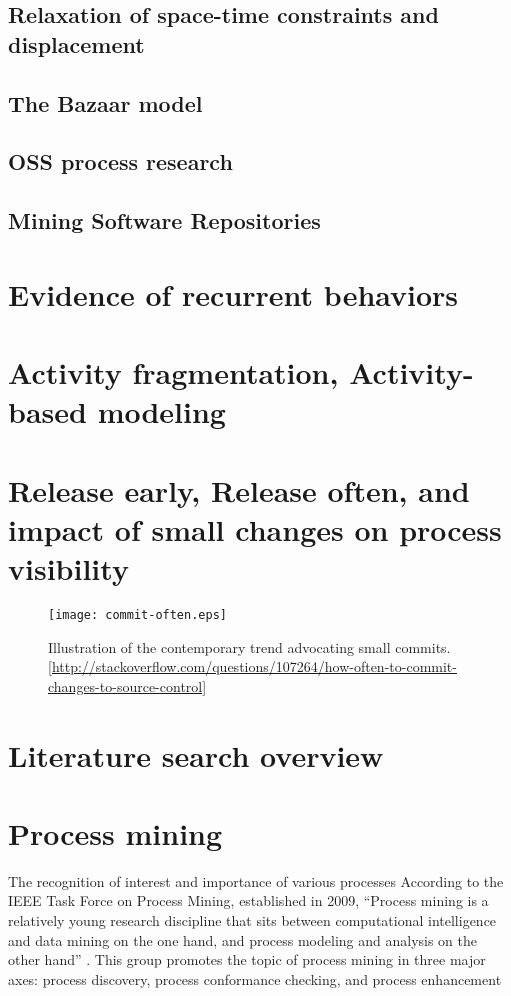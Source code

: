 \subsection{Relaxation of space-time constraints and displacement}
\subsection{The Bazaar model}
\subsection{OSS process research}
\subsection{Mining Software Repositories}\label{background.msr.summary}


\section{Evidence of recurrent behaviors}

\section{Activity fragmentation, Activity-based modeling}\label{activity}

\section{Release early, Release often, and impact of small changes on process visibility}
\begin{figure}[tbp]
   \centering
   \texttt{[image: commit-often.eps]}
   \caption{Illustration of the contemporary trend advocating small commits. 
\ref{http://stackoverflow.com/questions/107264/how-often-to-commit-changes-to-source-control}}
   \label{fig:commit-often}
\end{figure}


\section{Literature search overview}

\section{Process mining}
The recognition of interest and importance of various processes 
According to the IEEE Task Force on Process Mining, established in 2009, ``Process mining is 
a relatively young research discipline that sits between computational intelligence and data 
mining on the one hand, and process modeling and analysis on the other hand'' \cite{citeulike:11077707}.
This group promotes the topic of process mining in three major axes: process discovery,
process conformance checking, and process enhancement 

